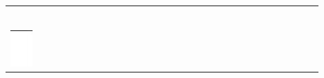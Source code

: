 \documentclass[10pt]{article}
\begin{document}
\begin{center}
\begin{tabular}{|c|c|c|c|c|c|c|c|c|c|c|c|c|c|c|c|c|c|c|c|c|c|c|c|c|c|c|c|c|c|}
\hline
 &  &  &  &  &  &  &  &  &  &  &  &  &  &  &  &  &  &  &  &  &  &  &  &  &  &  &  &  &  \\
\hline
 &  &  &  &  &  &  &  &  &  &  &  &  &  &  &  &  &  &  &  &  &  &  &  &  &  &  &  &  &  \\
\hline
 &  &  &  &  &  &  &  &  &  &  &  &  &  &  &  &  &  &  &  &  &  &  &  &  &  &  &  &  &  \\
\hline
 &  &  &  &  &  &  &  &  &  &  &  &  &  &  &  &  &  &  &  &  &  &  &  &  &  &  &  &  &  \\
\hline
 &  &  &  &  &  &  &  &  &  &  &  &  &  &  &  &  &  &  &  &  &  &  &  &  &  &  &  &  &  \\
\hline
 &  &  &  &  &  &  &  &  &  &  &  &  &  &  &  &  &  &  &  &  &  &  &  &  &  &  &  &  &  \\
\hline
 &  &  &  &  &  &  &  &  &  &  &  &  &  &  &  &  &  &  &  &  &  &  &  &  &  &  &  &  &  \\
\hline
\includegraphics[max width=\textwidth]{2024_11_21_dd21f7544b65bcf1b3c7g-14(1)}

\end{tabular}
\end{center}
\end{document}
